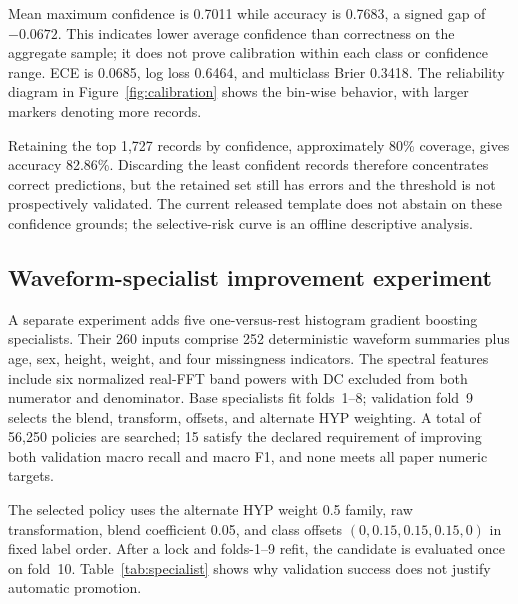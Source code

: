 Mean maximum confidence is 0.7011 while accuracy is 0.7683, a signed gap of $-0.0672$. This indicates lower average confidence than correctness on the aggregate sample; it does not prove calibration within each class or confidence range. ECE is 0.0685, log loss 0.6464, and multiclass Brier 0.3418. The reliability diagram in Figure~\ref{fig:calibration} shows the bin-wise behavior, with larger markers denoting more records.

Retaining the top 1,727 records by confidence, approximately 80\% coverage, gives accuracy 82.86\%. Discarding the least confident records therefore concentrates correct predictions, but the retained set still has errors and the threshold is not prospectively validated. The current released template does not abstain on these confidence grounds; the selective-risk curve is an offline descriptive analysis.


\subsection{Waveform-specialist improvement experiment}
A separate experiment adds five one-versus-rest histogram gradient boosting specialists. Their 260 inputs comprise 252 deterministic waveform summaries plus age, sex, height, weight, and four missingness indicators. The spectral features include six normalized real-FFT band powers with DC excluded from both numerator and denominator. Base specialists fit folds~1--8; validation fold~9 selects the blend, transform, offsets, and alternate HYP weighting. A total of 56,250 policies are searched; 15 satisfy the declared requirement of improving both validation macro recall and macro F1, and none meets all paper numeric targets.

The selected policy uses the alternate HYP weight 0.5 family, raw transformation, blend coefficient 0.05, and class offsets $(0,0.15,0.15,0.15,0)$ in fixed label order. After a lock and folds-1--9 refit, the candidate is evaluated once on fold~10. Table~\ref{tab:specialist} shows why validation success does not justify automatic promotion.

